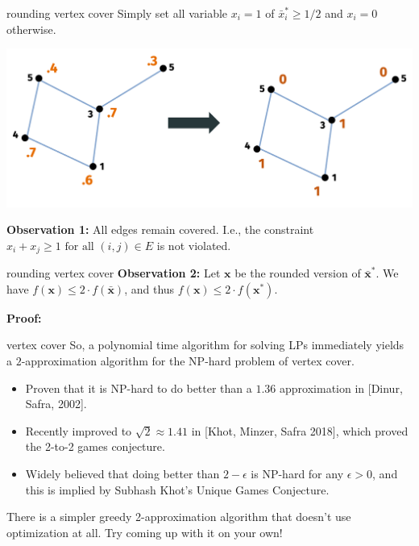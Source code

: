 \documentclass[compress]{beamer}
\newcommand{\bv}[1]{\mathbf{#1}}
\begin{document}
\begin{frame}[t]{rounding vertex cover}
	Simply set all variable $x_i = 1$ of $\bar{x}_i^* \geq 1/2$ and $x_i = 0$ otherwise.
	\begin{center}
		\includegraphics[width=\textwidth]{round.png}
	\end{center}
	\textbf{Observation 1:} All edges remain covered. I.e., the constraint $x_i + x_j \geq 1 \text{ for all } (i,j) \in E$ is not violated.
\end{frame}

\begin{frame}[t]{rounding vertex cover}
	\textbf{Observation 2:} Let $\bv{x}$ be the rounded version of $\bar{\bv{x}}^*$. We have $f(\bv{x}) \leq 2 \cdot f(\bar{\bv{x}})$, and thus $f(\bv{x}) \leq 2 \cdot f({\bv{x}^*})$. 

	\textbf{Proof:}

\end{frame}

\begin{frame}[t]{vertex cover}
	So, a polynomial time algorithm for solving LPs immediately yields a $2$-approximation algorithm for the NP-hard problem of vertex cover. 

	\begin{itemize}
		\item Proven that it is NP-hard to do better than a $1.36$ approximation in [Dinur, Safra, 2002]. 
		\item Recently improved to $\sqrt{2} \approx 1.41$ in [Khot, Minzer, Safra 2018], which proved the 2-to-2 games conjecture. 
		\item Widely believed that doing better than $2-\epsilon$ is NP-hard for any $\epsilon > 0$, and this is implied by Subhash Khot's Unique Games Conjecture.
	\end{itemize}
	There is a simpler greedy 2-approximation algorithm that doesn't use optimization at all. Try coming up with it on your own!
\end{frame}
\end{document}
